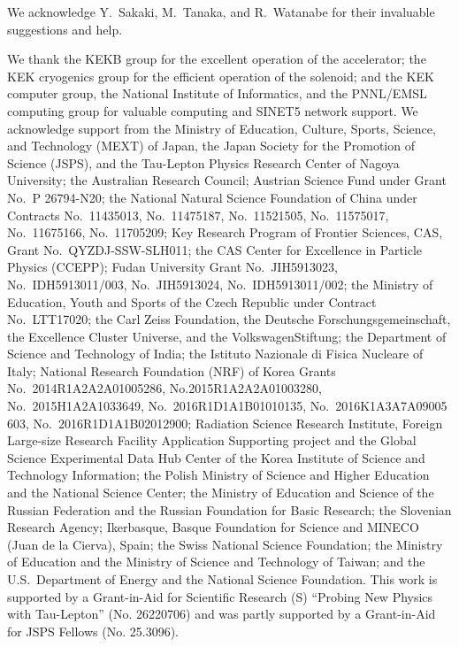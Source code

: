 \documentclass[aps,prd,twocolumn,superscriptaddress,showpacs,preprintnumbers,amsmath,amssymb]{revtex4-1}
\begin{document}
\begin{acknowledgements}

We acknowledge Y.~Sakaki, M.~Tanaka, and R.~Watanabe for their invaluable suggestions and help.

We thank the KEKB group for the excellent operation of the
accelerator; the KEK cryogenics group for the efficient
operation of the solenoid; and the KEK computer group,
the National Institute of Informatics, and the 
PNNL/EMSL computing group for valuable computing
and SINET5 network support.  We acknowledge support from
the Ministry of Education, Culture, Sports, Science, and
Technology (MEXT) of Japan, the Japan Society for the 
Promotion of Science (JSPS), and the Tau-Lepton Physics 
Research Center of Nagoya University; 
the Australian Research Council;
Austrian Science Fund under Grant No.~P 26794-N20;
the National Natural Science Foundation of China under Contracts
No.~11435013,
No.~11475187,
No.~11521505,
No.~11575017,
No.~11675166,
No.~11705209;
Key Research Program of Frontier Sciences, CAS, Grant No.~QYZDJ-SSW-SLH011;
the CAS Center for Excellence in Particle Physics (CCEPP);
Fudan University Grant No.~JIH5913023, No.~IDH5913011/003,
No.~JIH5913024, No.~IDH5913011/002;
the Ministry of Education, Youth and Sports of the Czech
Republic under Contract No.~LTT17020;
the Carl Zeiss Foundation, the Deutsche Forschungsgemeinschaft, the
Excellence Cluster Universe, and the VolkswagenStiftung;
the Department of Science and Technology of India; 
the Istituto Nazionale di Fisica Nucleare of Italy; 
National Research Foundation (NRF) of Korea Grants No.~2014R1A2A2A01005286, No.2015R1A2A2A01003280,
No.~2015H1A2A1033649, No.~2016R1D1A1B01010135, No.~2016K1A3A7A09005 603, No.~2016R1D1A1B02012900; Radiation Science Research Institute, Foreign Large-size Research Facility Application Supporting project and the Global Science Experimental Data Hub Center of the Korea Institute of Science and Technology Information;
the Polish Ministry of Science and Higher Education and 
the National Science Center;
the Ministry of Education and Science of the Russian Federation and
the Russian Foundation for Basic Research;
the Slovenian Research Agency;
Ikerbasque, Basque Foundation for Science and
MINECO (Juan de la Cierva), Spain;
the Swiss National Science Foundation; 
the Ministry of Education and the Ministry of Science and Technology of Taiwan;
and the U.S.\ Department of Energy and the National Science Foundation.
This work is supported by a Grant-in-Aid for Scientific Research (S) ``Probing New Physics with Tau-Lepton'' (No. 26220706) 
and was partly supported by a Grant-in-Aid for JSPS Fellows (No. 25.3096).

\end{acknowledgements}
\end{document}
